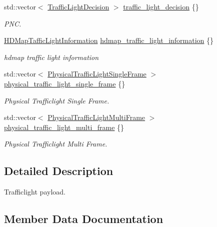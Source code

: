 \begin{DoxyCompactItemize}
std\+::vector$<$ \hyperlink{structmaf__perception__interface_1_1TrafficLightDecision}{Traffic\+Light\+Decision} $>$ \hyperlink{structmaf__perception__interface_1_1TrafficLightPerceptionResult_a195cf85c5dfd3abd19dc0d7999af5146}{traffic\+\_\+light\+\_\+decision} \{\}
\begin{DoxyCompactList}\small\item\em P\+NC. \end{DoxyCompactList}\item 
\hyperlink{structmaf__perception__interface_1_1HDMapTafficLightInformation}{H\+D\+Map\+Taffic\+Light\+Information} \hyperlink{structmaf__perception__interface_1_1TrafficLightPerceptionResult_a839235c5b6cc5808d2828a4b0486208d}{hdmap\+\_\+traffic\+\_\+light\+\_\+information} \{\}
\begin{DoxyCompactList}\small\item\em hdmap traffic light information \end{DoxyCompactList}\item 
std\+::vector$<$ \hyperlink{structmaf__perception__interface_1_1PhysicalTrafficLightSingleFrame}{Physical\+Traffic\+Light\+Single\+Frame} $>$ \hyperlink{structmaf__perception__interface_1_1TrafficLightPerceptionResult_a27ffcb668adbd9b8998f2d973059b50c}{physical\+\_\+traffic\+\_\+light\+\_\+single\+\_\+frame} \{\}
\begin{DoxyCompactList}\small\item\em Physical Trafficlight Single Frame. \end{DoxyCompactList}\item 
std\+::vector$<$ \hyperlink{structmaf__perception__interface_1_1PhysicalTrafficLightMultiFrame}{Physical\+Traffic\+Light\+Multi\+Frame} $>$ \hyperlink{structmaf__perception__interface_1_1TrafficLightPerceptionResult_a25c9cb4fc05796e072514a57880f702f}{physical\+\_\+traffic\+\_\+light\+\_\+multi\+\_\+frame} \{\}
\begin{DoxyCompactList}\small\item\em Physical Trafficlight Multi Frame. \end{DoxyCompactList}\end{DoxyCompactItemize}


\subsection{Detailed Description}
Trafficlight payload. 

\subsection{Member Data Documentation}
\mbox{\label{structmaf__perception__interface_1_1TrafficLightPerceptionResult_adc9a5bb3801a8821f2462717a9857fc3}} 
